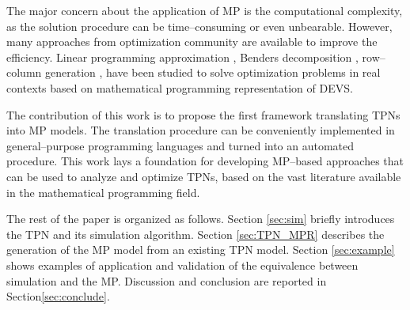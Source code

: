 \documentclass[suppldata]{interact}
\theoremstyle{plain}
\theoremstyle{definition}
\theoremstyle{remark}
\begin{document}
The major concern about the application of MP is the computational complexity, %
as the solution procedure can be time--consuming or even unbearable. However, many approaches from optimization community are available to improve the efficiency. Linear programming approximation \citep{alfieri2012mathematical}, Benders decomposition \citep{weiss2015buffer}, row--column generation \citep{alfieri2020time}, have been studied to solve optimization problems in %
real contexts based on mathematical programming representation of DEVS.


The contribution of this work is to propose the first framework translating TPNs into MP models. The translation procedure can be conveniently implemented in general--purpose programming languages and turned into an automated procedure. This work lays a foundation %
for developing MP--based approaches %
that can be used to analyze and optimize TPNs, based on the vast literature available in the mathematical programming field. 


The rest of the paper is organized as follows. Section \ref{sec:sim} briefly introduces the TPN and its simulation algorithm. Section \ref{sec:TPN_MPR} describes the generation of the MP model from an existing TPN model. Section \ref{sec:example} shows examples of application and validation of the equivalence between simulation and the MP. Discussion and conclusion are reported in Section\ref{sec:conclude}.







\end{document}
